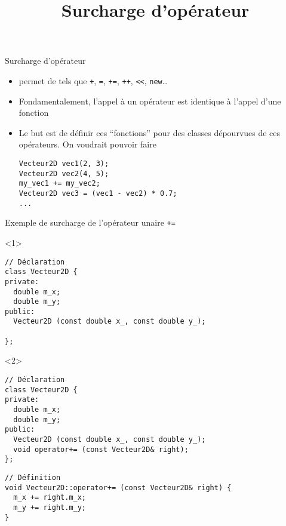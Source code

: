 \documentclass[c]{beamer}
\title{Surcharge d'opérateur}
\begin{document}
\maketitle

\begin{frame}[fragile,label={sec:orgheadline1}]{Surcharge d'opérateur}
 \begin{itemize}
\item \Cpp permet de  tels que \texttt{+}, \texttt{=}, \texttt{+=}, \texttt{++},
\texttt{<<}, \texttt{new}\ldots{}

\item Fondamentalement, l'appel à un opérateur est identique à l'appel d'une
fonction 

\item Le but est de définir ces ``fonctions'' pour des classes dépourvues de ces opérateurs. On voudrait pouvoir faire
\begin{verbatim}
Vecteur2D vec1(2, 3);
Vecteur2D vec2(4, 5);
my_vec1 += my_vec2;
Vecteur2D vec3 = (vec1 - vec2) * 0.7;
...
\end{verbatim}

\end{itemize}
\end{frame}

\begin{frame}[fragile]{Exemple de surcharge de l'opérateur unaire \texttt{+=}}

\begin{onlyenv}<1>
\begin{verbatim}
// Déclaration
class Vecteur2D {
private:
  double m_x;
  double m_y;
public:
  Vecteur2D (const double x_, const double y_);

};
\end{verbatim}
\end{onlyenv}
\begin{onlyenv}<2>
\begin{verbatim}
// Déclaration
class Vecteur2D {
private:
  double m_x;
  double m_y;
public:
  Vecteur2D (const double x_, const double y_);
  void operator+= (const Vecteur2D& right);
};
\end{verbatim}
\end{onlyenv}
\pause
\vspace{1em}
\begin{verbatim}
// Définition
void Vecteur2D::operator+= (const Vecteur2D& right) {
  m_x += right.m_x;
  m_y += right.m_y;
}
\end{verbatim}
\end{frame}
\end{document}
